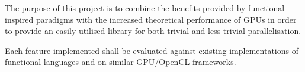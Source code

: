 The purpose of this project is to combine the benefits provided by functional-inspired paradigms with the increased theoretical performance of \ac{GPUs} in order to provide an easily-utilised library for both trivial and less trivial parallelisation.

Each feature implemented shall be evaluated against existing implementations of functional languages and on similar GPU/\ac{OpenCL} frameworks.
